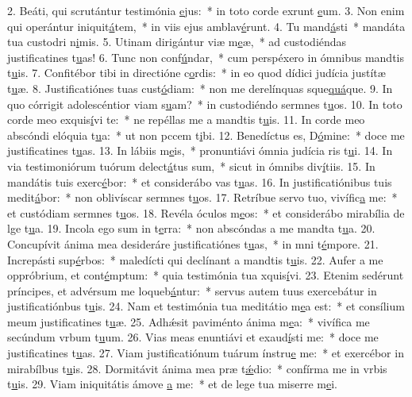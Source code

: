2. Beáti, qui scrutántur testimónia \uline{e}jus:~* in toto corde exrunt \uline{e}um.
3. Non enim qui operántur iniquit\uline{á}tem,~* in viis ejus amblav\uline{é}runt.
4. Tu mand\uline{á}sti~* mandáta tua custodri n\uline{i}mis.
5. Utinam dirigántur viæ m\uline{e}æ,~* ad custodiéndas justificatines t\uline{u}as!
6. Tunc non conf\uline{ú}ndar,~* cum perspéxero in ómnibus mandtis t\uline{u}is.
7. Confitébor tibi in directióne c\uline{o}rdis:~* in eo quod dídici judícia justítæ t\uline{u}æ.
8. Justificatiónes tuas cust\uline{ó}diam:~* non me derelínquas sque\uline{quá}que.
9. In quo córrigit adolescéntior viam s\uline{u}am?~* in custodiéndo sermnes t\uline{u}os.
10. In toto corde meo exquis\uline{í}vi te:~* ne repéllas me a mandtis t\uline{u}is.
11. In corde meo abscóndi elóquia t\uline{u}a:~* ut non pccem t\uline{i}bi.
12. Benedíctus es, D\uline{ó}mine:~* doce me justificatines t\uline{u}as.
13. In lábiis m\uline{e}is,~* pronuntiávi ómnia judícia ris t\uline{u}i.
14. In via testimoniórum tuórum delect\uline{á}tus sum,~* sicut in ómnibs div\uline{í}tiis.
15. In mandátis tuis exerc\uline{é}bor:~* et considerábo vas t\uline{u}as.
16. In justificatiónibus tuis medit\uline{á}bor:~* non oblivíscar sermnes t\uline{u}os.
17. Retríbue servo tuo, vivífic\uline{a} me:~* et custódiam sermnes t\uline{u}os.
18. Revéla óculos m\uline{e}os:~* et considerábo mirabília de lge t\uline{u}a.
19. Incola ego sum in t\uline{e}rra:~* non abscóndas a me mandta t\uline{u}a.
20. Concupívit ánima mea desideráre justificatiónes t\uline{u}as,~* in mni t\uline{é}mpore.
21. Increpásti sup\uline{é}rbos:~* maledícti qui declínant a mandtis t\uline{u}is.
22. Aufer a me oppróbrium, et cont\uline{é}mptum:~* quia testimónia tua xquis\uline{í}vi.
23. Etenim sedérunt príncipes, et advérsum me loqueb\uline{á}ntur:~* servus autem tuus exercebátur in justificatiónbus t\uline{u}is.
24. Nam et testimónia tua meditátio m\uline{e}a est:~* et consílium meum justificatines t\uline{u}æ.
25. Adhǽsit paviménto ánima m\uline{e}a:~* vivífica me secúndum vrbum t\uline{u}um.
26. Vias meas enuntiávi et exaud\uline{í}sti me:~* doce me justificatines t\uline{u}as.
27. Viam justificatiónum tuárum ínstru\uline{e} me:~* et exercébor in mirabílbus t\uline{u}is.
28. Dormitávit ánima mea præ t\uline{ǽ}dio:~* confírma me in vrbis t\uline{u}is.
29. Viam iniquitátis ámove \uline{a} me:~* et de lege tua miserre m\uline{e}i.
